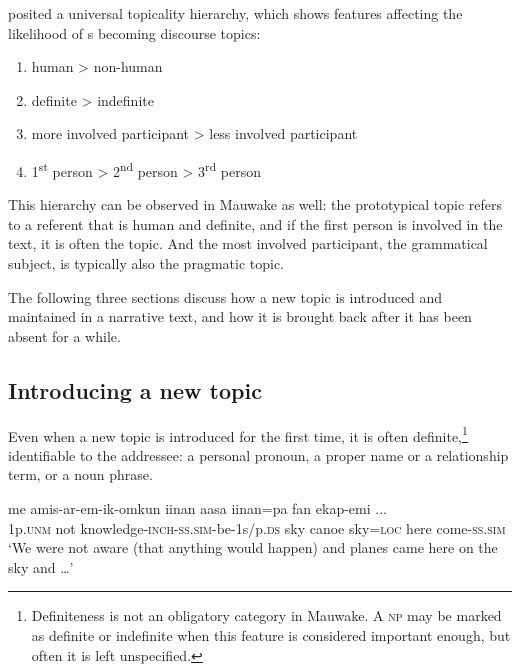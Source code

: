\citet[152]{Givon1976} posited a universal topicality hierarchy, which shows features affecting the likelihood of s becoming discourse topics: 

\begin{enumerate}
 \item   human {{\textgreater}} non-human
 \item  definite {{\textgreater}} indefinite
 \item  more involved participant {{\textgreater}} less involved participant
 \item  1\textsuperscript{st} person {{\textgreater}} 2\textsuperscript{nd} person {{\textgreater}} 3\textsuperscript{rd} person
\end{enumerate}






This hierarchy can be observed in Mauwake as well: the prototypical topic refers to a referent that is human and definite, and if the first person is involved in the text, it is often the topic. And the most involved participant, the grammatical subject, is typically also the pragmatic topic. 

The following three sections discuss how a new topic is introduced and maintained in a narrative text, and how it is brought back after it has been absent for a while. 

\subsection{Introducing a new topic} \label{sec:9.2.1}

Even when a new topic is introduced for the first time, it is often definite,\footnote{Definiteness is not an obligatory category in Mauwake. A \textsc{np} may be marked as definite or indefinite when this  feature is considered important enough, but often it is left unspecified.} identifiable to the addressee: a personal pronoun, a proper name or a relationship term, or a noun phrase. 

\ea%
\label{ex:9:x1663}
\gll {}  me  amis-ar-em-ik-omkun  iinan  aasa iinan=pa  fan  ekap-emi  ... \\
1p.\textsc{unm}  not  knowledge-\textsc{inch}-\textsc{ss}.\textsc{sim}-be-1s/p.\textsc{ds}  sky  canoe sky=\textsc{loc}  here  come-\textsc{ss}.\textsc{sim} \\
\glt`We were not aware (that anything would happen) and planes came here on the sky and {\dots}'
\z


